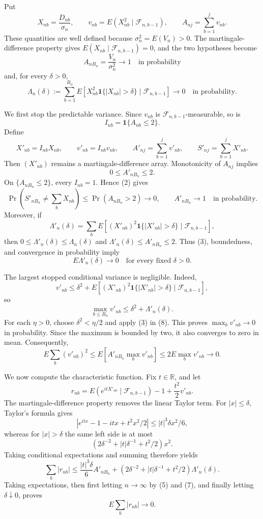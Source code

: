 Put
\[
X_{nb}=\frac{D_{nb}}{\sigma_n},\qquad
v_{nb}=E(X_{nb}^2\mid\mathcal F_{n,b-1}),\qquad
A_{nj}=\sum_{b=1}^{j}v_{nb}.
\tag{1}
\]
These quantities are well defined because \(\sigma_n^2=E(V_n)>0\). The martingale-difference property gives \(E(X_{nb}\mid\mathcal F_{n,b-1})=0\), and the two hypotheses become
\[
A_{nB_n}=\frac{V_n}{\sigma_n^2}\longrightarrow1
\quad\text{in probability}
\tag{2}
\]
and, for every \(\delta>0\),
\[
\Lambda_n(\delta):=\sum_{b=1}^{B_n}
E\!\left[X_{nb}^2\mathbf1\{|X_{nb}|>\delta\}\mid\mathcal F_{n,b-1}\right]
\longrightarrow0
\quad\text{in probability}.
\tag{3}
\]

We first stop the predictable variance. Since \(v_{nb}\) is \(\mathcal F_{n,b-1}\)-measurable, so is
\[
I_{nb}=\mathbf1\{A_{nb}\le2\}.
\]
Define
\[
X'_{nb}=I_{nb}X_{nb},\qquad v'_{nb}=I_{nb}v_{nb},\qquad
A'_{nj}=\sum_{b=1}^{j}v'_{nb},\qquad S'_{nj}=\sum_{b=1}^{j}X'_{nb}.
\tag{4}
\]
Then \((X'_{nb})\) remains a martingale-difference array. Monotonicity of \(A_{nj}\) implies
\[
0\le A'_{nB_n}\le2.
\tag{5}
\]
On \(\{A_{nB_n}\le2\}\), every \(I_{nb}=1\). Hence (2) gives
\[
\Pr\!\left(S'_{nB_n}\ne\sum_bX_{nb}\right)
\le\Pr(A_{nB_n}>2)\longrightarrow0,
\qquad A'_{nB_n}\longrightarrow1
\quad\text{in probability}.
\tag{6}
\]
Moreover, if
\[
\Lambda'_n(\delta)=\sum_bE\!\left[(X'_{nb})^2
\mathbf1\{|X'_{nb}|>\delta\}\mid\mathcal F_{n,b-1}\right],
\]
then \(0\le\Lambda'_n(\delta)\le\Lambda_n(\delta)\) and \(\Lambda'_n(\delta)\le A'_{nB_n}\le2\). Thus (3), boundedness, and convergence in probability imply
\[
E\Lambda'_n(\delta)\longrightarrow0
\quad\text{for every fixed }\delta>0.
\tag{7}
\]

The largest stopped conditional variance is negligible. Indeed,
\[
v'_{nb}\le\delta^2+E\!\left[(X'_{nb})^2
\mathbf1\{|X'_{nb}|>\delta\}\mid\mathcal F_{n,b-1}\right],
\]
so
\[
\max_{b\le B_n}v'_{nb}\le\delta^2+\Lambda'_n(\delta).
\tag{8}
\]
For each \(\eta>0\), choose \(\delta^2<\eta/2\) and apply (3) in (8). This proves \(\max_bv'_{nb}\to0\) in probability. Since the maximum is bounded by two, it also converges to zero in mean. Consequently,
\[
E\sum_b(v'_{nb})^2
\le E\!\left[A'_{nB_n}\max_bv'_{nb}\right]
\le2E\max_bv'_{nb}\longrightarrow0.
\tag{9}
\]

We now compute the characteristic function. Fix \(t\in\mathbb R\), and let
\[
r_{nb}=E(e^{itX'_{nb}}\mid\mathcal F_{n,b-1})-1+\frac{t^2}{2}v'_{nb}.
\tag{10}
\]
The martingale-difference property removes the linear Taylor term. For \(|x|\le\delta\), Taylor's formula gives
\[
|e^{itx}-1-itx+t^2x^2/2|\le |t|^3\delta x^2/6,
\]
whereas for \(|x|>\delta\) the same left side is at most
\[
\left(2\delta^{-2}+|t|\delta^{-1}+t^2/2\right)x^2.
\]
Taking conditional expectations and summing therefore yields
\[
\sum_b|r_{nb}|
\le \frac{|t|^3\delta}{6}A'_{nB_n}
+\left(2\delta^{-2}+|t|\delta^{-1}+t^2/2\right)\Lambda'_n(\delta).
\tag{11}
\]
Taking expectations, then first letting \(n\to\infty\) by (5) and (7), and finally letting \(\delta\downarrow0\), proves
\[
E\sum_b|r_{nb}|\longrightarrow0.
\tag{12}
\]

